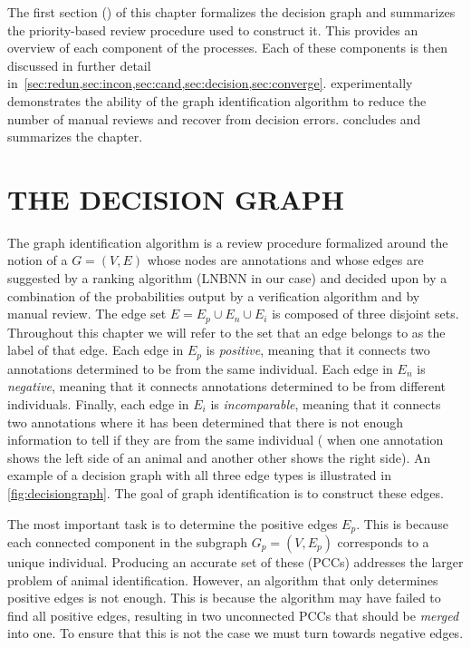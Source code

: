 The first section () of this chapter formalizes the decision graph and summarizes the
  priority-based review procedure used to construct it.
This provides an overview of each component of the processes.
Each of these components is then discussed in further detail
  in~\cref{sec:redun,sec:incon,sec:cand,sec:decision,sec:converge}.
 experimentally demonstrates the ability of the graph identification algorithm to reduce the
  number of manual reviews and recover from decision errors.
 concludes and summarizes the chapter.


\FloatBarrier{}
\section{THE DECISION GRAPH}\label{sec:decisiongraph}

The graph identification algorithm is a review procedure formalized around the notion of a  $G = (V, E)$ whose nodes are annotations and whose edges are suggested by a ranking algorithm (LNBNN in
  our case) and decided upon by a combination of the probabilities output by a verification algorithm and by manual
  review.
The edge set $E = E_p \cup E_n \cup E_i$ is composed of three disjoint sets.
Throughout this chapter we will refer to the set that an edge belongs to as the label of that edge.
Each edge in $E_p$ is \emph{positive}, meaning that it connects two annotations determined to be from the same
  individual.
Each edge in $E_n$ is \emph{negative}, meaning that it connects annotations determined to be from different
  individuals.
Finally, each edge in $E_i$ is \emph{incomparable}, meaning that it connects two annotations where it has been
  determined that there is not enough information to tell if they are from the same individual (\eg{} when one
  annotation shows the left side of an animal and another other shows the right side).
An example of a decision graph with all three edge types is illustrated in \cref{fig:decisiongraph}.
The goal of graph identification is to construct these edges.

\decisiongraph{}

The most important task is to determine the positive edges $E_p$.
This is because each connected component in the subgraph $G_p = (V, E_p)$ corresponds to a unique individual.
Producing an accurate set of these  (PCCs) addresses the larger problem
  of animal identification.
However, an algorithm that only determines positive edges is not enough.
This is because the algorithm may have failed to find all positive edges, resulting in two unconnected PCCs that
  should be \emph{merged} into one.
To ensure that this is not the case we must turn towards negative edges.

